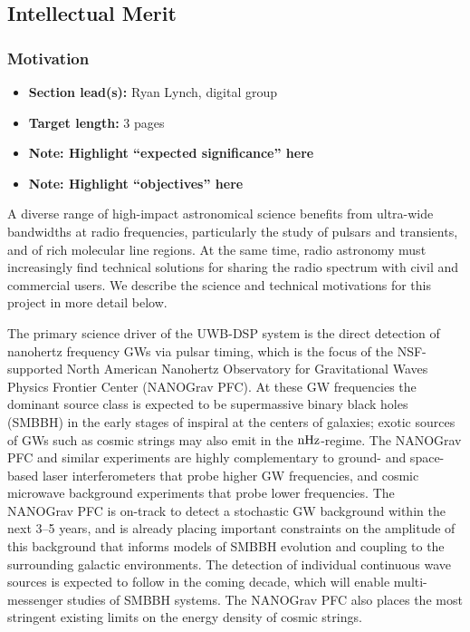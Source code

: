 \documentclass[10pt]{myNSF}
\begin{document}
\subsection{Intellectual Merit}
\label{sec:IM}

\subsubsection{Motivation}
\label{sec:motivation}

\begin{itemize}
\item{\textbf{Section lead(s):} Ryan Lynch, digital group}
\item{\textbf{Target length:} 3 pages}
\item{\textbf{Note: Highlight ``expected significance'' here}}
\item{\textbf{Note: Highlight ``objectives'' here}}
\end{itemize}

A diverse range of high-impact astronomical science benefits from
ultra-wide bandwidths at radio frequencies, particularly the study of
pulsars and transients, and of rich molecular line regions.  At the
same time, radio astronomy must increasingly find technical solutions
for sharing the radio spectrum with civil and commercial users.  We
describe the science and technical motivations for this project in
more detail below.

\label{sec:science_motivation}

 The primary science driver
of the UWB-DSP system is the direct detection of nanohertz frequency
GWs via pulsar timing, which is the focus of the NSF-supported North
American Nanohertz Observatory for Gravitational Waves Physics
Frontier Center (NANOGrav PFC).  At these GW frequencies the dominant
source class is expected to be supermassive binary black holes (SMBBH)
in the early stages of inspiral at the centers of galaxies; exotic
sources of GWs such as cosmic strings may also emit in the
$\textrm{nHz}$-regime.  The NANOGrav PFC and similar experiments are highly
complementary to ground- and space-based laser interferometers that
probe higher GW frequencies, and cosmic microwave background
experiments that probe lower frequencies.  The NANOGrav PFC is
on-track to detect a stochastic GW background within the next 3--5
years, and is already placing important constraints on the amplitude
of this background that informs models of SMBBH evolution and coupling
to the surrounding galactic environments.  The detection of individual
continuous wave sources is expected to follow in the coming decade,
which will enable multi-messenger studies of SMBBH systems.  The
NANOGrav PFC also places the most stringent existing limits on the
energy density of cosmic strings.
\end{document}

